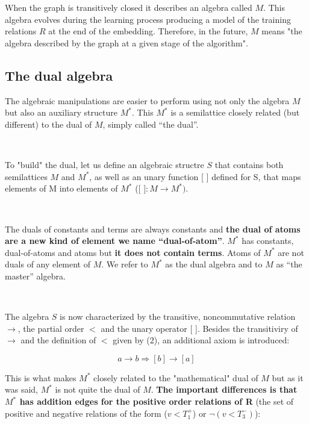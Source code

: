 \documentclass[a4paper, 11pt]{article}
\begin{document}
\

\

When the graph is transitively closed it describes an algebra called $M$. This algebra
evolves during the learning process producing a model of the training relations $R$ at the end
of the embedding. Therefore, in the future, $M$ means "the algebra described by the graph at a
given stage of the algorithm".

\subsection{The dual algebra}

The algebraic manipulations are easier to perform using not only the algebra $M$ but also an auxiliary structure $M^{\ast}$. This $M^{\ast}$ is a semilattice closely related (but different) to the dual of $M$, simply called “the dual”.

\

To "build" the dual, let us define an algebraic structre $S$ that contains both semilattices $M$ and $M^{\ast}$, as well as an unary function  [ ] defined for S, that maps elements of M into elements of $M^{\ast}$ ($\text{[ ]}: M \rightarrow M^{\ast})$.

\

The duals of constants and terms are always constants and \textbf{the dual of atoms are a new kind of element we name “dual-of-atom”}. $M^{\ast}$ has constants, dual-of-atoms and atoms but \textbf{it does not contain terms}. Atoms of $M^{\ast}$ are not duals of any element of $M$. We refer to $M^{\ast}$ as the dual algebra and to $M$ as “the master” algebra.

\

The algebra $S$ is now characterized by the transitive, noncommutative relation $\rightarrow$, the partial order $<$ and the unary operator [ ]. Besides the transitiviry of $\rightarrow$ and the definition of $<$ given by (2), an additional axiom is introduced:

\begin{equation}
    a \rightarrow b \Rightarrow [b] \rightarrow [a]
\end{equation}

This is what makes $M^{\ast}$ closely related to the "mathematical" dual of $M$ but as it was said, $M^{\ast}$ is not quite the dual of $M$. \textbf{The important differences is that $M^{\ast}$ has addition edges for the positive order relations of R} (the set of positive and negative relations of the form ($v < T_1^+$) or $\neg(v < T_3^-)$):
\end{document}
